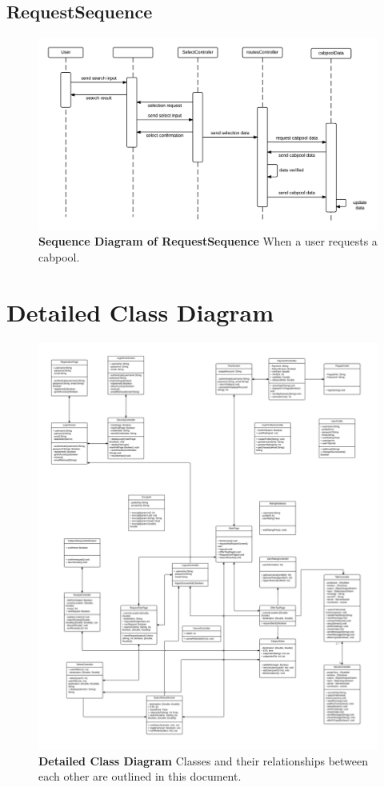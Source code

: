 \documentclass[]{article}
\begin{document}
\subsection{RequestSequence}

\begin{figure}[H]
\label{reqSeq}
	\centering
	\includegraphics[width=1\textwidth]{RequestSequence.png}
	\caption{\textbf{Sequence Diagram of RequestSequence} When a user requests a cabpool.}
\end{figure}


\section{Detailed Class Diagram}
\label{DetailedClass}

\begin{figure}[H]
\label{classDig}
	\centering
	\includegraphics[width=1\textwidth]{class.png}
	\caption{\textbf{Detailed Class Diagram} Classes and their relationships between each other are outlined in this document.}
\end{figure}
\end{document}
